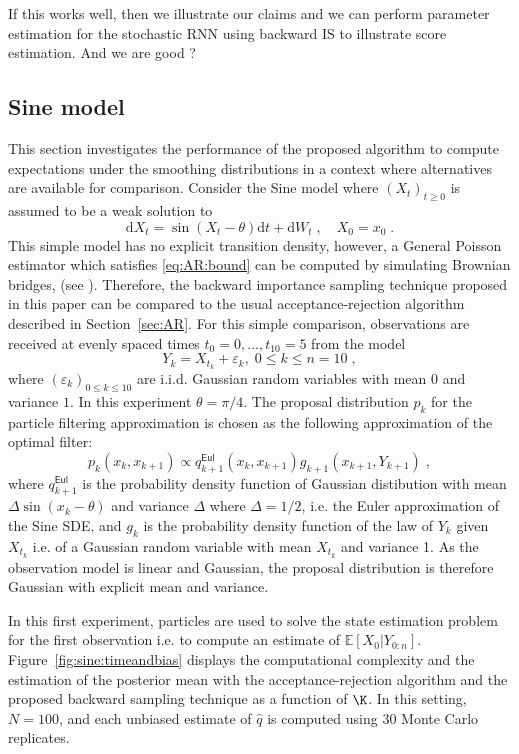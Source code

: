 \documentclass{article}
\def\pE{\mathbb{E}}
\newcommand{\rmd}{\ensuremath{\mathrm{d}}}
\newcommand{\eqsp}{\;}
\begin{document}
If this works well, then we illustrate our claims and we can perform parameter estimation for the stochastic RNN using backward IS to illustrate score estimation. And we are good ?

\subsection{Sine model}
This section investigates the performance of the proposed algorithm to compute  expectations under the smoothing distributions in a context where  alternatives are available for comparison. Consider the Sine model where $(X_t)_{t\geqslant 0}$ is assumed to be a weak solution to
$$
\rmd X_t = \sin(X_t-\theta)\rmd t + \rmd W_t\eqsp,\quad X_0 = x_0\eqsp.
$$
This simple model has no explicit transition density, however, a General Poisson estimator which satisfies \eqref{eq:AR:bound} can be computed by simulating Brownian bridges, (see \cite{beskos2006exact}). 
Therefore, the backward importance sampling technique proposed in this paper can be compared to the usual acceptance-rejection algorithm described in Section~\ref{sec:AR}. 
For this simple comparison, observations are received at evenly spaced times $t_0=0,\ldots, t_{10} = 5$ from the model
\begin{equation}
\label{eq:obs:model:SINE}
Y_k=X_{t_k}+\varepsilon_k,\eqsp 0\leqslant k \leqslant n = 10\eqsp,
\end{equation}
where $(\varepsilon_k)_{0 \leqslant k\leqslant 10}$ are i.i.d. Gaussian random variables with mean $0$ and variance $1$. In this experiment $\theta = \pi/4$. 
The proposal distribution $p_k$ for the particle filtering approximation is chosen as the following approximation of the optimal filter:
\begin{equation}
\label{eq:optimal:filter}
p_{k}(x_{k},x_{k+1})\!\propto\! q^{\mathsf{Eul}}_{k+1}(x_{k},x_{k+1})g_{k+1}(x_{k+1},Y_{k+1})\eqsp,
\end{equation}
where $q^{\mathsf{Eul}}_{k+1}$ is the probability density function of Gaussian distibution with mean $\Delta \sin(x_k-\theta)$ and variance $\Delta$ where $\Delta = 1/2$, i.e. the Euler approximation of the Sine SDE, and $g_k$ is the probability density function of the law of $Y_k$ given $X_{t_k}$ i.e. of a Gaussian random variable with mean $X_{t_k}$ and variance 1. 
As the observation model is linear and Gaussian, the proposal distribution is therefore Gaussian with explicit mean and variance. 

In this first experiment, particles are used to solve the state estimation problem for the first observation i.e. to compute an estimate of $ \pE[ X_{0} | Y_{0:n}]$.
Figure~\ref{fig:sine:timeandbias} displays the computational complexity and the estimation of the posterior mean with the acceptance-rejection algorithm and the proposed backward sampling technique as a function of $\K$. 
In this setting, $N=100$, and each unbiased estimate of $\hat{q}$ is computed using 30 Monte Carlo replicates.
\end{document}
